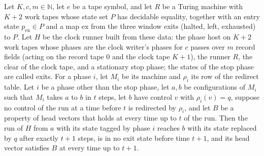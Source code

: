 \begin{lemma}
\label{Turing.cw_seg}
\leanok
{}
Let $K,c,m\in\mathbb{N}$, let $e$ be a tape symbol, and let $R$ be a Turing machine with $K+2$
work tapes whose state set $P$ has decidable equality, together with an entry state
$p_{\mathrm{en}}\in P$ and a map $\mathrm{ex}$ from the three window exits (halted, left,
exhausted) to $P$. Let $H$ be the clock runner built from these data: the phase host on $K+2$
work tapes whose phases are the clock writer's phases for $c$ passes over $m$ record fields
(acting on the record tape $0$ and the clock tape $K+1$), the runner $R$, the clear of the
clock tape, and a stationary stop phase; the states of the stop phase are called exits. For a
phase $i$, let $M_i$ be its machine and $\rho_i$ its row of the redirect table. Let $i$ be a
phase other than the stop phase, let $a,b$ be configurations of $M_i$ such that $M_i$ takes $a$
to $b$ in $t$ steps, let $b$ have control $v$ with $\rho_i(v)=q$, suppose no control of the run
at a time before $t$ is redirected by $\rho_i$, and let $B$ be a property of head vectors that
holds at every time up to $t$ of the run. Then the run of $H$ from $a$ with its state tagged by
phase $i$ reaches $b$ with its state replaced by $q$ after exactly $t+1$ steps, is in no exit
state before time $t+1$, and its head vector satisfies $B$ at every time up to $t+1$.
\end{lemma}

